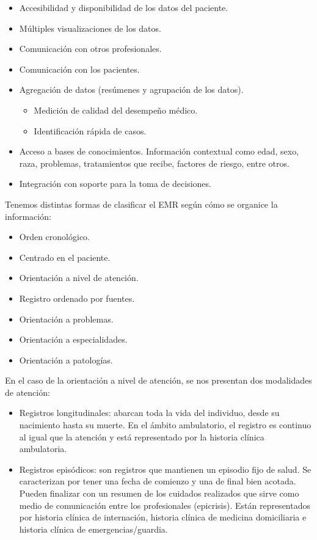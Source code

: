     \begin{itemize}
		\item Accesibilidad y disponibilidad de los datos del paciente.
		\item Múltiples visualizaciones de los datos.
		\item Comunicación con otros profesionales.
		\item Comunicación con los pacientes.
		\item Agregación de datos (resúmenes y agrupación de los datos).
        \begin{itemize}
			\item Medición de calidad del desempeño médico.
			\item Identificación rápida de casos.
		\end{itemize}
		\item Acceso a bases de conocimientos. Información contextual como edad, sexo, raza, problemas, tratamientos que recibe, factores de riesgo, entre otros.
		\item Integración con soporte para la toma de decisiones.
	\end{itemize}
Tenemos distintas formas de clasificar el EMR según cómo se organice la información:
\begin{itemize}
	\item Orden cronológico.
	\item Centrado en el paciente.
	\item Orientación a nivel de atención.
	\item Registro ordenado por fuentes.
	\item Orientación a problemas.
	\item Orientación a especialidades.
	\item Orientación a patologías.
\end{itemize}
En el caso de la orientación a nivel de atención, se nos presentan dos modalidades de atención:
\begin{itemize}
	\item Registros longitudinales: abarcan toda la vida del individuo, desde su nacimiento hasta su muerte. En el ámbito ambulatorio, el registro es continuo al igual que la atención y está representado por la historia clínica ambulatoria.
    \item Registros episódicos: son registros que mantienen un episodio fijo de salud. Se caracterizan por tener una fecha de comienzo y una de final bien acotada. Pueden finalizar con un resumen de los cuidados realizados que sirve como medio de comunicación entre los profesionales (epicrisis). Están representados por historia clínica de internación, historia clínica de medicina domiciliaria e historia clínica de emergencias/guardia.
\end{itemize}


